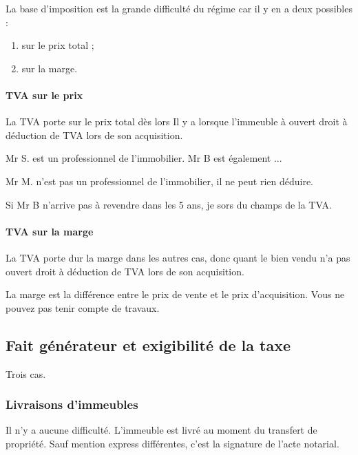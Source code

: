 		La base d'imposition est la grande difficulté du régime car il y en a deux possibles :
		\begin{enumerate}
			\item sur le prix total ;
			\item sur la marge.
		\end{enumerate}
		
		\paragraph{TVA sur le prix}
			
			La TVA porte sur le prix total dès lors Il y a lorsque l'immeuble à ouvert droit à déduction de TVA lors de son acquisition.
			
			\begin{exemple}
				Mr S. est un professionnel de l'immobilier. Mr B est également ...
				
				Mr M. n'est pas un professionnel de l'immobilier, il ne peut rien déduire.
				
				Si Mr B n'arrive pas à revendre dans les 5 ans, je sors du champs de la TVA. 
			\end{exemple}
			
		\paragraph{TVA sur la marge}
			
			La TVA porte dur la marge dans les autres cas, donc quant le bien vendu n'a pas ouvert droit à déduction de TVA lors de son acquisition.
			
			\medskip La marge est la différence entre le prix de vente et le prix d'acquisition.
			Vous ne pouvez pas tenir compte de travaux.
	
	\subsection{Fait générateur et exigibilité de la taxe}
		
		Trois cas.
		
		\subsubsection{Livraisons d’immeubles}
			
			Il n'y a aucune difficulté. L'immeuble est livré au moment du transfert de propriété. Sauf mention express différentes, c'est la signature de l'acte notarial.
			
